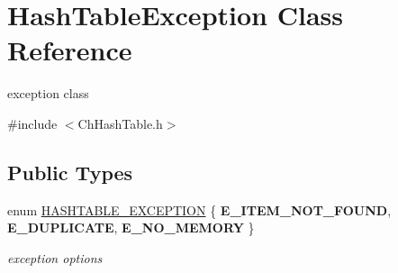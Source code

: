 \hypertarget{classHashTableException}{\section{Hash\-Table\-Exception Class Reference}
\label{classHashTableException}
}


exception class  




{\ttfamily \#include $<$Ch\-Hash\-Table.\-h$>$}

\subsection*{Public Types}
\begin{DoxyCompactItemize}
\item 
enum \hyperlink{classHashTableException_a4db5491532d21bac48964e4dff18cce0}{H\-A\-S\-H\-T\-A\-B\-L\-E\-\_\-\-E\-X\-C\-E\-P\-T\-I\-O\-N} \{ {\bfseries E\-\_\-\-I\-T\-E\-M\-\_\-\-N\-O\-T\-\_\-\-F\-O\-U\-N\-D}, 
{\bfseries E\-\_\-\-D\-U\-P\-L\-I\-C\-A\-T\-E}, 
{\bfseries E\-\_\-\-N\-O\-\_\-\-M\-E\-M\-O\-R\-Y}
 \}
\begin{DoxyCompactList}\small\item\em exception options \end{DoxyCompactList}\end{DoxyCompactItemize}
